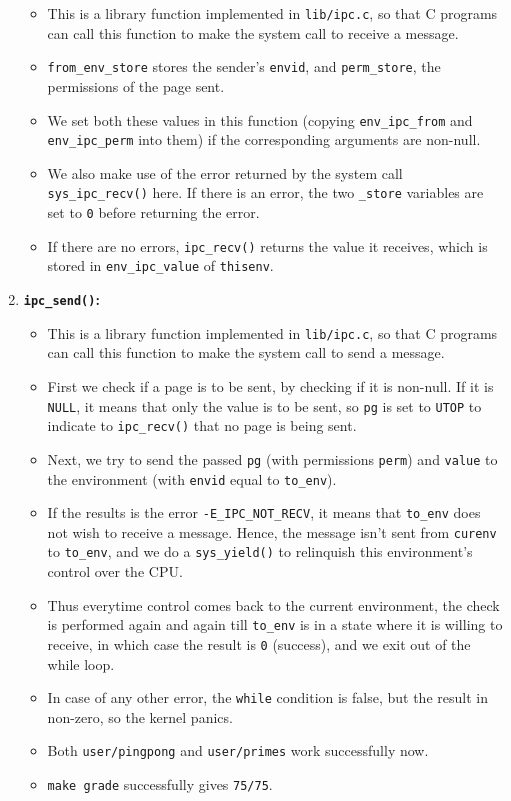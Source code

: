 \documentclass[]{article}
\begin{document}
\begin{enumerate}
  \begin{itemize}
  \itemsep1pt\parskip0pt
  \item
    This is a library function implemented in \texttt{lib/ipc.c}, so
    that C programs can call this function to make the system call to
    receive a message.
  \item
    \texttt{from\_env\_store} stores the sender's \texttt{envid}, and
    \texttt{perm\_store}, the permissions of the page sent.
  \item
    We set both these values in this function (copying
    \texttt{env\_ipc\_from} and \texttt{env\_ipc\_perm} into them) if
    the corresponding arguments are non-null.
  \item
    We also make use of the error returned by the system call
    \texttt{sys\_ipc\_recv()} here. If there is an error, the two
    \texttt{\_store} variables are set to \texttt{0} before returning
    the error.
  \item
    If there are no errors, \texttt{ipc\_recv()} returns the value it
    receives, which is stored in \texttt{env\_ipc\_value} of
    \texttt{thisenv}.
  \end{itemize}
\item
  \textbf{\texttt{ipc\_send()}:}

  \begin{itemize}
  \itemsep1pt\parskip0pt
  \item
    This is a library function implemented in \texttt{lib/ipc.c}, so
    that C programs can call this function to make the system call to
    send a message.
  \item
    First we check if a page is to be sent, by checking if it is
    non-null. If it is \texttt{NULL}, it means that only the value is to
    be sent, so \texttt{pg} is set to \texttt{UTOP} to indicate to
    \texttt{ipc\_recv()} that no page is being sent.
  \item
    Next, we try to send the passed \texttt{pg} (with permissions
    \texttt{perm}) and \texttt{value} to the environment (with
    \texttt{envid} equal to \texttt{to\_env}).
  \item
    If the results is the error \texttt{-E\_IPC\_NOT\_RECV}, it means
    that \texttt{to\_env} does not wish to receive a message. Hence, the
    message isn't sent from \texttt{curenv} to \texttt{to\_env}, and we
    do a \texttt{sys\_yield()} to relinquish this environment's control
    over the CPU.
  \item
    Thus everytime control comes back to the current environment, the
    check is performed again and again till \texttt{to\_env} is in a
    state where it is willing to receive, in which case the result is
    \texttt{0} (success), and we exit out of the while loop.
  \item
    In case of any other error, the \texttt{while} condition is false,
    but the result in non-zero, so the kernel panics.
  \item
    Both \texttt{user/pingpong} and \texttt{user/primes} work
    successfully now.
  \item
    \texttt{make grade} successfully gives \texttt{75/75}.
  \end{itemize}
\end{enumerate}
\end{document}
